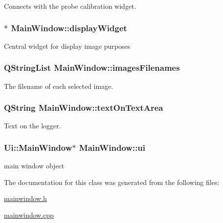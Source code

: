 Connects with the probe calibration widget. 

\hypertarget{class_main_window_a79daf435968c77e526ddf286bcc86a8f}{
\subsubsection[{display\-Widget}]{$\ast$ {\bf Main\-Window\-::display\-Widget}}}\label{d9/dc6/class_main_window_a79daf435968c77e526ddf286bcc86a8f}
Central widget for display image purposes \hypertarget{class_main_window_a8b33f17919e8e99127a612476aefdaed}{
\subsubsection[{images\-Filenames}]{\setlength{\rightskip}{0pt plus 5cm}Q\-String\-List {\bf Main\-Window\-::images\-Filenames}}}\label{d9/dc6/class_main_window_a8b33f17919e8e99127a612476aefdaed}


The filename of each selected image. 

\hypertarget{class_main_window_aac7c4f4184a77a56eef59fff591c9521}{
\subsubsection[{text\-On\-Text\-Area}]{\setlength{\rightskip}{0pt plus 5cm}Q\-String {\bf Main\-Window\-::text\-On\-Text\-Area}}}\label{d9/dc6/class_main_window_aac7c4f4184a77a56eef59fff591c9521}


Text on the logger. 

\hypertarget{class_main_window_a35466a70ed47252a0191168126a352a5}{
\subsubsection[{ui}]{\setlength{\rightskip}{0pt plus 5cm}Ui\-::\-Main\-Window$\ast$ {\bf Main\-Window\-::ui}}}\label{d9/dc6/class_main_window_a35466a70ed47252a0191168126a352a5}


main window object 



The documentation for this class was generated from the following files\-:\begin{DoxyCompactItemize}
\item 
\hyperlink{mainwindow_8h}{mainwindow.\-h}\item 
\hyperlink{mainwindow_8cpp}{mainwindow.\-cpp}\end{DoxyCompactItemize}
